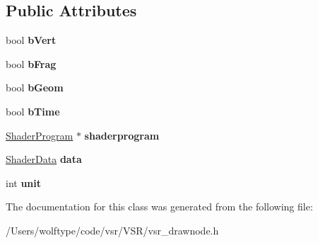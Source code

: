 \subsection*{Public Attributes}
\begin{DoxyCompactItemize}
\item 
\hypertarget{classvsr_1_1_shader_node_ae2bac3c74aa951e43365350de73d0d9f}{bool {\bfseries b\-Vert}}\label{classvsr_1_1_shader_node_ae2bac3c74aa951e43365350de73d0d9f}

\item 
\hypertarget{classvsr_1_1_shader_node_a2f874dda99c96919bfb35d0b17ff6cc0}{bool {\bfseries b\-Frag}}\label{classvsr_1_1_shader_node_a2f874dda99c96919bfb35d0b17ff6cc0}

\item 
\hypertarget{classvsr_1_1_shader_node_ac1740bad11d424737e6e48d9dd95add0}{bool {\bfseries b\-Geom}}\label{classvsr_1_1_shader_node_ac1740bad11d424737e6e48d9dd95add0}

\item 
\hypertarget{classvsr_1_1_shader_node_aec512551855d923b01d001e506652770}{bool {\bfseries b\-Time}}\label{classvsr_1_1_shader_node_aec512551855d923b01d001e506652770}

\item 
\hypertarget{classvsr_1_1_shader_node_a07ad2ef82154e3c71806443a9e8e9256}{\hyperlink{classvsr_1_1_shader_program}{Shader\-Program} $\ast$ {\bfseries shaderprogram}}\label{classvsr_1_1_shader_node_a07ad2ef82154e3c71806443a9e8e9256}

\item 
\hypertarget{classvsr_1_1_shader_node_aec717abe722ce98cb3f338d7eaaa1a45}{\hyperlink{structvsr_1_1_shader_data}{Shader\-Data} {\bfseries data}}\label{classvsr_1_1_shader_node_aec717abe722ce98cb3f338d7eaaa1a45}

\item 
\hypertarget{classvsr_1_1_shader_node_acc5bf005e1cbf165698ad8b5f73a16a4}{int {\bfseries unit}}\label{classvsr_1_1_shader_node_acc5bf005e1cbf165698ad8b5f73a16a4}

\end{DoxyCompactItemize}


The documentation for this class was generated from the following file\-:\begin{DoxyCompactItemize}
\item 
/\-Users/wolftype/code/vsr/\-V\-S\-R/vsr\-\_\-drawnode.\-h\end{DoxyCompactItemize}
